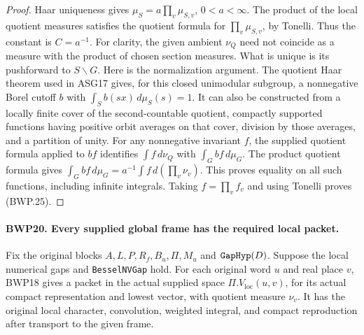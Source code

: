 \documentclass[11pt,a4paper]{article}
\numberwithin{equation}{section}
\theoremstyle{remark}\newtheorem{remark}[theorem]{Remark}
\begin{document}
\begin{proof}
Haar uniqueness gives \(\mu_S=a\prod_v\mu_{S,v}\),
\(0<a<\infty\).  The product of the local quotient measures
satisfies the quotient formula for \(\prod_v\mu_{S,v}\),
by Tonelli.  Thus the constant is \(C=a^{-1}\).
For clarity, the given ambient \(\nu_Q\) need not coincide
as a measure with the product of chosen section measures.
What is unique is its pushforward to \(S\backslash G\).
Here is the normalization argument.  The quotient Haar theorem
used in ASG17 gives, for this closed unimodular subgroup, a
nonnegative Borel cutoff \(b\) with
\(\int_S b(sx)\,d\mu_S(s)=1\).
It can also be constructed from a locally finite cover of the
second-countable quotient, compactly supported functions having
positive orbit averages on that cover, division by those averages,
and a partition of unity.  For any nonnegative invariant \(f\),
the supplied quotient formula applied to \(bf\) identifies
\(\int f\,d\nu_Q\) with \(\int_G bf\,d\mu_G\).
The product quotient formula gives
\(\int_G bf\,d\mu_G=a^{-1}\int f\,d(\prod_v\nu_v)\).
This proves equality on all such
functions, including infinite integrals.  Taking \(f=\prod_v f_v\)
and using Tonelli proves (BWP.25).
\end{proof}

\paragraph{BWP20. Every supplied global frame has the required local packet.}
\label{claim:BWP20}
Fix the original blocks \(A,L,P,R_f,B_u,\Pi,M_u\) and
\(\texttt{Gap\allowbreak Hyp}(D)\).  Suppose the local numerical gaps and
\texttt{Bessel\allowbreak NVGap} hold.  For each original word \(u\) and
real place \(v\), BWP18 gives a packet in the actual supplied
space \(\Pi.V_{\mathrm{loc}}(u,v)\), for its actual compact
representation and lowest vector, with quotient measure \(\nu_v\).
It has the original local character, convolution, weighted integral,
and compact reproduction after transport to the given frame.
\end{document}
